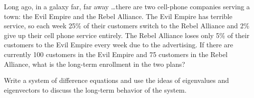 \begin{problem}
    Long ago, in a galaxy far, far away \dots there are two cell-phone companies serving a
    town: the Evil Empire and the Rebel Alliance. The Evil Empire has terrible service, so
    each week 25\% of their customers switch to the Rebel Alliance and 2\% give up their
    cell phone service entirely. The Rebel Alliance loses only 5\% of their customers to
    the Evil Empire every week due to the advertising.  If there are currently 100
    customers in the Evil Empire and 75 customers in the Rebel Alliance, what is the
    long-term enrollment in the two plans?

    Write a system of difference equations and use the ideas of eigenvalues and
    eigenvectors to discuss the long-term behavior of the system.
\end{problem}


